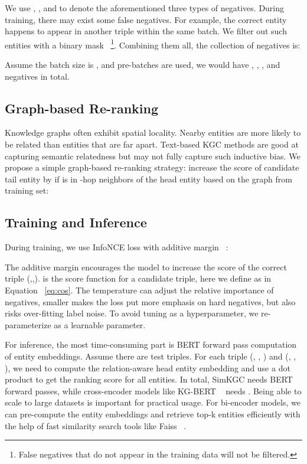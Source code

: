 \documentclass[11pt]{article}
\begin{document}
We use , , and 
to denote the aforementioned three types of negatives.
During training,
there may exist some false negatives.
For example,
the correct entity happens to appear in another triple within the same batch.
We filter out such entities with a binary mask
~\footnote{False negatives that do not appear in the training data will not be filtered.}.
Combining them all,
the collection of negatives  is:


Assume the batch size is ,
and  pre-batches are used,
we would have ,
,
,
and  negatives in total.

\subsection{Graph-based Re-ranking}

Knowledge graphs often exhibit spatial locality.
Nearby entities are more likely to be related than entities that are far apart.
Text-based KGC methods are good at capturing semantic relatedness
but may not fully capture such inductive bias.
We propose a simple graph-based re-ranking strategy:
increase the score of candidate tail entity 
by  if  is in -hop neighbors 
of the head entity  based on the graph from training set:


\subsection{Training and Inference}
During training,
we use InfoNCE loss with additive margin ~\citep{chen2020simple,yang2019improving}:


The additive margin  encourages the model
to increase the score of the correct triple (,,).
 is the score function for a candidate triple,
here we define 
as in Equation ~\ref{eq:cos}.
The temperature  can adjust the relative importance of negatives,
smaller  makes the loss put more emphasis on hard negatives,
but also risks over-fitting label noise.
To avoid tuning  as a hyperparameter,
we re-parameterize  as a learnable parameter.

For inference,
the most time-consuming part is  BERT forward pass computation of entity embeddings.
Assume there are  test triples.
For each triple (, , ) and (, , ),
we need to compute the relation-aware head entity embedding
and use a dot product to get the ranking score for all entities.
In total,
SimKGC needs  BERT forward passes,
while cross-encoder models like KG-BERT ~\citep{yao2019kg}
needs .
Being able to scale to large datasets is important for practical usage.
For bi-encoder models,
we can pre-compute the entity embeddings
and retrieve top-k entities efficiently
with the help of fast similarity search tools like Faiss ~\citep{Johnson2021BillionScaleSS}.
\end{document}
